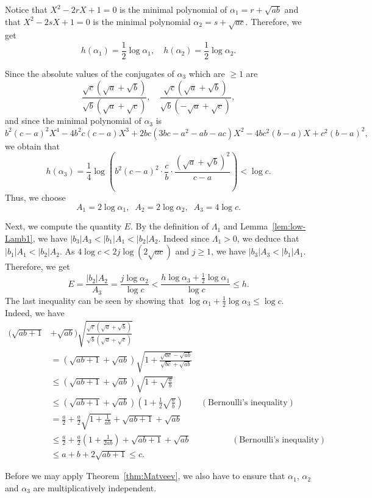 \documentclass{amsart}
\theoremstyle{definition}
\begin{document}
Notice that $X^2-2rX+1=0$ is the minimal polynomial of $\alpha_1=r+\sqrt{ab}$ and
that $X^2-2sX+1=0$ is the minimal polynomial $\alpha_2=s+\sqrt{ac}$. Therefore, we get 
$$
 h(\alpha_1)=\frac{1}{2}\log\alpha_1,\quad h(\alpha_2)=\frac{1}{2}\log \alpha_2.
$$

Since the absolute values of the conjugates of $\alpha_3$ which are $\geq 1$ are 
$$
\frac{\sqrt{c}(\sqrt{a}+\sqrt{b})}{\sqrt{b}(\sqrt{a}+\sqrt{c})},\quad \frac{\sqrt{c}(\sqrt{a}+\sqrt{b})}{\sqrt{b}(-\sqrt{a}+\sqrt{c})},
$$
and since the minimal polynomial of $\alpha_3$ is
$$
b^2(c-a)^2X^4-4b^2c(c-a)X^3+2bc(3bc-a^2-ab-ac)X^2-4bc^2(b-a)X+c^2(b-a)^2,
$$
we obtain that 
$$
h(\alpha_3)=\frac{1}{4}\log\left(b^2(c-a)^2\cdot \frac{c}{b} \cdot \frac{(\sqrt{a}+\sqrt{b})^2}{c-a}\right)<\log c.
$$
Thus, we choose
$$
A_1 =2\log \alpha_1,\;\;A_2=2\log\alpha_2,\;\; A_3=4\log c.
$$

Next, we compute the quantity $E$. By the definition of $\Lambda_1$ and Lemma~\ref{lem:low-Lamb1}, we have $|b_3|A_3<|b_1|A_1<|b_2|A_2$.
Indeed since $\Lambda_1>0$, we deduce that $|b_1|A_1<|b_2|A_2$. As $4\log c<2j \log (2\sqrt{ac})$ and $j\geq 1$, we have $|b_3|A_3<|b_1|A_1$. Therefore, we get
$$
E=\frac{|b_2|A_2}{A_3}=\frac{j\log\alpha_2}{\log c}<\frac{h \log \alpha_3+\frac 12\log \alpha_1}{\log c}\leq h.
$$
The last inequality can be seen by showing that $\log\alpha_1+\frac 12\log\alpha_3\leq \log c$. Indeed, we have
\begin{align*}
(\sqrt{ab+1}&+\sqrt{ab}) \sqrt{\frac{\sqrt{c}(\sqrt{a}+\sqrt{b})}{\sqrt{b}(\sqrt{a}+\sqrt{c})}} \\
&= (\sqrt{ab+1}+\sqrt{ab}) \sqrt{1+\frac{\sqrt{ac}-\sqrt{ab}}{\sqrt{bc}+\sqrt{ab}}}\\
&\leq  (\sqrt{ab+1}+\sqrt{ab}) \sqrt{1+\sqrt{\frac ab}}\\
&\leq  (\sqrt{ab+1}+\sqrt{ab}) \left(1+\frac 12 \sqrt{\frac ab}\right) \qquad (\text{Bernoulli's inequality})\\
&=  \frac{a}2 + \frac{a}2 \sqrt{1+\frac{1}{ab}}+\sqrt{ab+1}+\sqrt{ab}\\
&\leq  \frac a2+\frac a2\left(1+ \frac{1}{2ab}\right)+\sqrt{ab+1}+\sqrt{ab}\qquad \qquad  \;\;\; (\text{Bernoulli's inequality})\\     
&\leq  a+b+2\sqrt{ab+1}\leq c.
\end{align*}

Before we may apply Theorem~\ref{thm:Matveev}, we also have to ensure that $\alpha_1$, $\alpha_2$ and $\alpha_3$ are multiplicatively independent.
\end{document}
